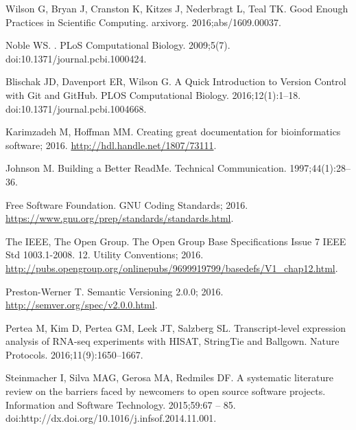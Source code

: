 \documentclass[10pt,letterpaper]{article}
\begin{document}
\begin{thebibliography}{10}
Wilson G, Bryan J, Cranston K, Kitzes J, Nederbragt L, Teal TK.
\newblock Good Enough Practices in Scientific Computing.
\newblock arxivorg. 2016;abs/1609.00037.

Noble WS.
.
\newblock PLoS Computational Biology. 2009;5(7).
\newblock doi:{10.1371/journal.pcbi.1000424}.

Blischak JD, Davenport ER, Wilson G.
\newblock A Quick Introduction to Version Control with Git and GitHub.
\newblock PLOS Computational Biology. 2016;12(1):1--18.
\newblock doi:{10.1371/journal.pcbi.1004668}.

Karimzadeh M, Hoffman MM. Creating great documentation for bioinformatics
  software; 2016.
\newblock \url{http://hdl.handle.net/1807/73111}.

Johnson M.
\newblock Building a Better ReadMe.
\newblock Technical Communication. 1997;44(1):28--36.

{\relax Free Software Foundation}. GNU Coding Standards; 2016.
\newblock \url{https://www.gnu.org/prep/standards/standards.html}.

{\relax The IEEE}, {\relax The Open Group}. The Open Group Base Specifications
  Issue 7 IEEE Std 1003.1-2008. 12. Utility Conventions; 2016.
\newblock
  \url{http://pubs.opengroup.org/onlinepubs/9699919799/basedefs/V1_chap12.html}.

Preston-Werner T. Semantic Versioning 2.0.0; 2016.
\newblock \url{http://semver.org/spec/v2.0.0.html}.

Pertea M, Kim D, Pertea GM, Leek JT, Salzberg SL.
\newblock Transcript-level expression analysis of RNA-seq experiments with
  HISAT, StringTie and Ballgown.
\newblock Nature Protocols. 2016;11(9):1650--1667.

Steinmacher I, Silva MAG, Gerosa MA, Redmiles DF.
\newblock A systematic literature review on the barriers faced by newcomers to
  open source software projects.
\newblock Information and Software Technology. 2015;59:67 -- 85.
\newblock doi:{http://dx.doi.org/10.1016/j.infsof.2014.11.001}.

\end{thebibliography}
\end{document}
